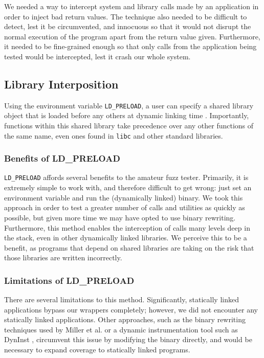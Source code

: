 We needed a way to intercept system and library calls made by an application in order to inject bad return values. The technique also needed to be difficult to detect, lest it be circumvented, and innocuous so that it would not disrupt the normal execution of the program apart from the return value given. Furthermore, it needed to be fine-grained enough so that only calls from the  application being tested would be intercepted, lest it crash our whole system.

\subsection{Library Interposition}
Using the environment variable \texttt{LD\_PRELOAD}, a user can specify a shared library object that is loaded before any others at dynamic linking time \cite{ldpreload}. Importantly, functions within this shared library take precedence over any other functions of the same name, even ones found in \texttt{libc} and other standard libraries.

\subsubsection{Benefits of LD\_PRELOAD}
\texttt{LD\_PRELOAD} affords several benefits to the amateur fuzz tester. Primarily, it is extremely simple to work with, and therefore difficult to get wrong: just set an environment variable and run the (dynamically linked) binary. We took this approach in order to test a greater number of calls and utilities as quickly as possible, but given more time we may have opted to use binary rewriting. Furthermore, this method enables the interception of calls many levels deep in the stack, even in other dynamically linked libraries. We perceive this to be a benefit, as programs that depend on shared libraries are taking on the risk that those libraries are written incorrectly.

\subsubsection{Limitations of LD\_PRELOAD}
There are several limitations to this method. Significantly, statically linked applications bypass our wrappers completely; however, we did not encounter any statically linked applications. Other approaches, such as the binary rewriting techniques used by Miller et al. \cite{bart} or a dynamic instrumentation tool such as DynInst \cite{dyninst}, circumvent this issue by modifying the binary directly, and would be necessary to expand coverage to statically linked programs.

